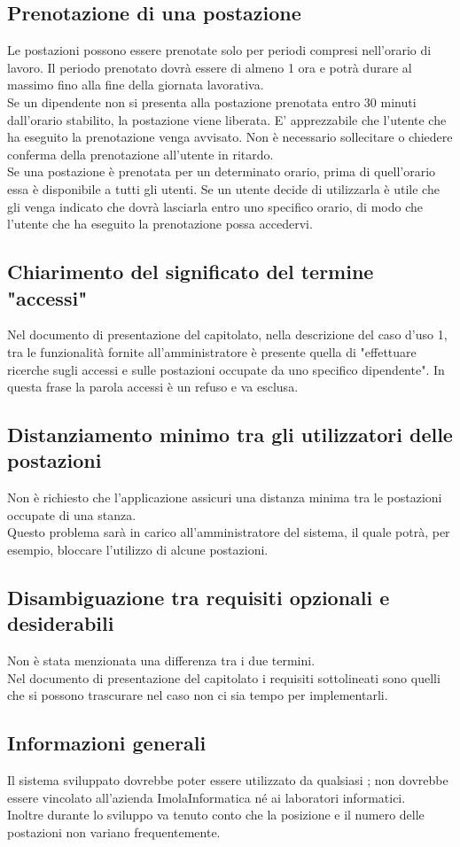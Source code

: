 \subsection*{Prenotazione di una postazione}
Le postazioni possono essere prenotate solo per periodi compresi nell'orario di lavoro.
Il periodo prenotato dovrà essere di almeno 1 ora e potrà durare al massimo fino alla fine della giornata lavorativa.\\
Se un dipendente non si presenta alla postazione prenotata entro 30 minuti dall'orario stabilito, la postazione viene liberata. E' apprezzabile che l'utente che ha eseguito la prenotazione venga avvisato. Non è necessario sollecitare o chiedere conferma della prenotazione all'utente in ritardo.\\
Se una postazione è prenotata per un determinato orario, prima di quell'orario essa è disponibile a tutti gli utenti. Se un utente decide di utilizzarla è utile che gli venga indicato che dovrà lasciarla entro uno specifico orario, di modo che l'utente che ha eseguito la prenotazione possa accedervi.   

\subsection*{Chiarimento del significato del termine "accessi"}
Nel documento di presentazione del capitolato, nella descrizione del caso d'uso 1, tra le funzionalità fornite all'amministratore è presente quella di "effettuare ricerche sugli accessi e sulle postazioni occupate da uno specifico dipendente". In questa frase la parola accessi è un refuso e va esclusa.

\subsection*{Distanziamento minimo tra gli utilizzatori delle postazioni}			
Non è richiesto che l'applicazione assicuri una distanza minima tra le postazioni occupate di una stanza.\\
Questo problema sarà in carico all'amministratore del sistema, il quale potrà, per esempio, bloccare l'utilizzo di alcune postazioni.

\subsection*{Disambiguazione tra requisiti opzionali e desiderabili}
Non è stata menzionata una differenza tra i due termini.\\
Nel documento di presentazione del capitolato i requisiti sottolineati sono quelli che si possono trascurare nel caso non ci sia tempo per implementarli.

\subsection*{Informazioni generali}
Il sistema sviluppato dovrebbe poter essere utilizzato da qualsiasi ; non dovrebbe essere vincolato all'azienda ImolaInformatica né ai laboratori informatici.\\
Inoltre durante lo sviluppo va tenuto conto che la posizione e il numero delle postazioni non variano frequentemente. 
